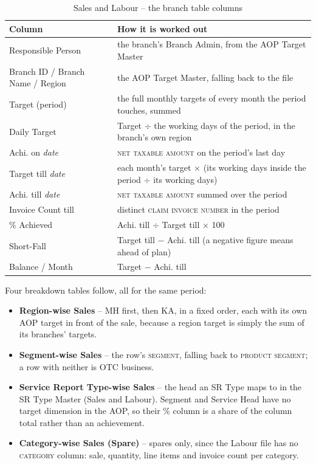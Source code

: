 \documentclass[11pt,a4paper]{article}
\newcommand{\col}[1]{\textsc{\small #1}}
\begin{document}
\begin{table}[H]\centering\small
\begin{tabularx}{\linewidth}{@{}p{4.4cm}X@{}}
\toprule
\textbf{Column} & \textbf{How it is worked out} \\
\midrule
Responsible Person & the branch's Branch Admin, from the AOP Target Master \\
Branch ID / Branch Name / Region & the AOP Target Master, falling back to the file \\
Target (period) & the full monthly targets of every month the period touches, summed \\
Daily Target & Target $\div$ the working days of the period, in the branch's own region \\
Achi. on \textit{date} & \col{net taxable amount} on the period's last day \\
Target till \textit{date} & each month's target $\times$ (its working days inside the
period $\div$ its working days) \\
Achi. till \textit{date} & \col{net taxable amount} summed over the period \\
Invoice Count till & distinct \col{claim invoice number} in the period \\
\% Achieved & Achi. till $\div$ Target till $\times$ 100 \\
Short-Fall & Target till $-$ Achi. till (a negative figure means ahead of plan) \\
Balance / Month & Target $-$ Achi. till \\
\bottomrule
\end{tabularx}
\caption{Sales and Labour -- the branch table columns}
\end{table}

Four breakdown tables follow, all for the same period:

\begin{itemize}
  \item \textbf{Region-wise Sales} -- MH first, then KA, in a fixed order, each with its
  own AOP target in front of the sale, because a region target is simply the sum of its
  branches' targets.
  \item \textbf{Segment-wise Sales} -- the row's \col{segment}, falling back to
  \col{product segment}; a row with neither is OTC business.
  \item \textbf{Service Report Type-wise Sales} -- the head an SR Type maps to in the SR
  Type Master (Sales and Labour). Segment and Service Head have no target dimension in the
  AOP, so their \% column is a share of the column total rather than an achievement.
  \item \textbf{Category-wise Sales (Spare)} -- spares only, since the Labour file has no
  \col{category} column: sale, quantity, line items and invoice count per category.
\end{itemize}
\end{document}
